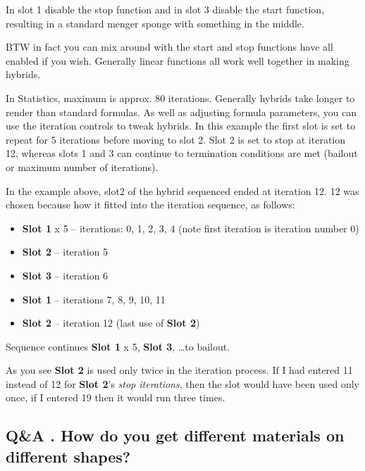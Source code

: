 In slot 1 disable the stop function
and in slot 3 disable the start function, resulting in a standard menger sponge
with something in the middle.

BTW in fact you can mix around
with the start and stop functions have all enabled if you wish. Generally linear
functions all work well together in making hybrids.

In
Statistics, maximum is approx. 80 iterations. Generally hybrids take longer to
render than standard formulas.
As well as adjusting formula parameters, you
can use the iteration controls to tweak hybrids. In this example the first slot
is set to repeat for 5 iterations before moving to slot 2. Slot 2 is set to stop
at iteration 12, whereas slots 1 and 3 can continue to termination conditions are
met (bailout or maximum number of iterations).

In the example above, slot2 of the hybrid sequenced ended at iteration 12. 12
was chosen because how it fitted into the iteration sequence, as follows:

\begin{itemize}
\item \textbf{Slot 1} x 5 -- iterations: 0, 1, 2, 3, 4 (note first iteration is iteration number 0)
\item \textbf{Slot 2} -- iteration 5
\item \textbf{Slot 3} -- iteration 6
\item \textbf{Slot 1} -- iterations 7, 8, 9, 10, 11
\item \textbf{Slot 2} -- iteration 12 (last use of \textbf{Slot 2})
\end{itemize}

Sequence continues \textbf{Slot 1} x 5, \textbf{Slot 3}, \ldots to bailout.

As you see \textbf{Slot 2} is used only twice in the iteration process. If I had entered 11 instead of 12 for \textbf{Slot 2}'s \emph{stop iterations}, then the slot would have been used only once, if I entered 19 then it would run three times.

\subsection{Q\&A . How do you get different materials on different
	shapes?}\label{qa-.-how-do-you-get-different-materials-on-different-shapes}

